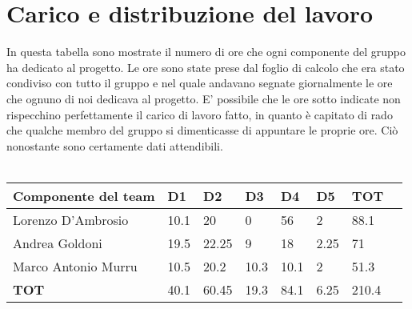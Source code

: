 \section{Carico e distribuzione del lavoro}
In questa tabella sono mostrate il numero di ore che ogni componente del gruppo ha dedicato al progetto. Le ore sono state prese dal foglio di calcolo che era stato condiviso con tutto il gruppo e nel quale andavano segnate giornalmente le ore che ognuno di noi dedicava al progetto. E' possibile che le ore sotto indicate non rispecchino perfettamente il carico di lavoro fatto, in quanto è capitato di rado che qualche membro del gruppo si dimenticasse di appuntare le proprie ore. Ciò nonostante sono certamente dati attendibili. \\
\\
\begin{tabularx}{\textwidth}{ |l |X|X|X|X|X|X| X|}
    \hline
    \textbf{Componente del team} & \textbf{D1} & \textbf{D2} & \textbf{D3} & \textbf{D4} & \textbf{D5} & \textbf{TOT}\\
    \hline
    Lorenzo D'Ambrosio & 10.1 & 20 & 0 & 56 & 2 & 88.1\\
    \hline
    Andrea Goldoni & 19.5 & 22.25 & 9 & 18 & 2.25 & 71\\
    \hline
    Marco Antonio Murru & 10.5& 20.2& 10.3& 10.1& 2& 51.3\\
    \hline
    \textbf{TOT} & 40.1 & 60.45 & 19.3 & 84.1 & 6.25 & 210.4\\
    \hline
\end{tabularx}
